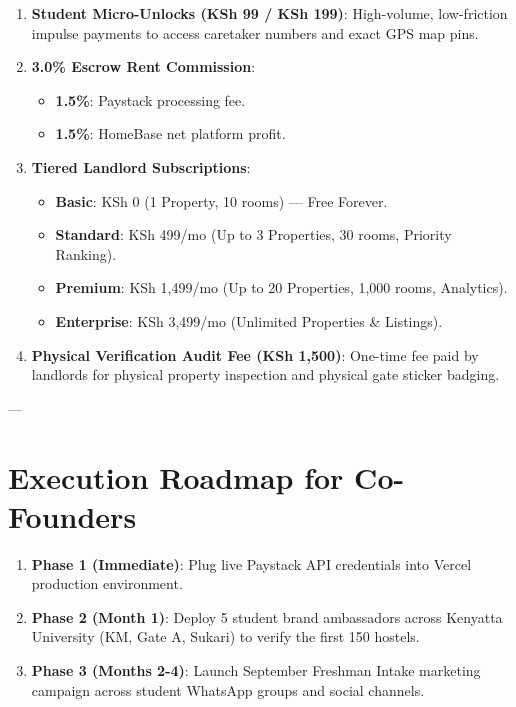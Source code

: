 \documentclass[11pt,a4paper]{article}
\begin{document}
\begin{enumerate}
    \item \textbf{Student Micro-Unlocks (KSh 99 / KSh 199)}: High-volume, low-friction impulse payments to access caretaker numbers and exact GPS map pins.
    \item \textbf{3.0\% Escrow Rent Commission}:
    \begin{itemize}[noitemsep]
        \item \textbf{1.5\%}: Paystack processing fee.
        \item \textbf{1.5\%}: HomeBase net platform profit.
    \end{itemize}
    \item \textbf{Tiered Landlord Subscriptions}:
    \begin{itemize}[noitemsep]
        \item \textbf{Basic}: KSh 0 (1 Property, 10 rooms) — Free Forever.
        \item \textbf{Standard}: KSh 499/mo (Up to 3 Properties, 30 rooms, Priority Ranking).
        \item \textbf{Premium}: KSh 1,499/mo (Up to 20 Properties, 1,000 rooms, Analytics).
        \item \textbf{Enterprise}: KSh 3,499/mo (Unlimited Properties \& Listings).
    \end{itemize}
    \item \textbf{Physical Verification Audit Fee (KSh 1,500)}: One-time fee paid by landlords for physical property inspection and physical gate sticker badging.
\end{enumerate}

---

\section{Execution Roadmap for Co-Founders}

\begin{enumerate}
    \item \textbf{Phase 1 (Immediate)}: Plug live Paystack API credentials into Vercel production environment.
    \item \textbf{Phase 2 (Month 1)}: Deploy 5 student brand ambassadors across Kenyatta University (KM, Gate A, Sukari) to verify the first 150 hostels.
    \item \textbf{Phase 3 (Months 2-4)}: Launch September Freshman Intake marketing campaign across student WhatsApp groups and social channels.
\end{enumerate}
\end{document}
